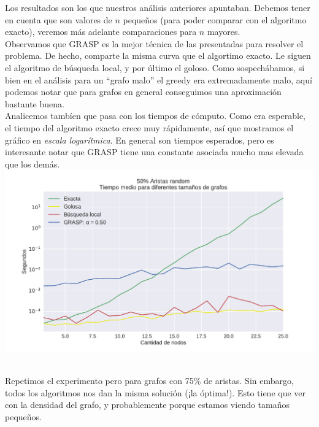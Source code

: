 Los resultados son los que nuestros análisis anteriores apuntaban. Debemos tener en cuenta que son valores de $n$ pequeños (para poder comparar con el algoritmo exacto), veremos más adelante comparaciones para $n$ mayores. \\

Observamos que GRASP es la mejor técnica de las presentadas para resolver el problema. De hecho, comparte la misma curva que el algortimo exacto. Le siguen el algoritmo de búsqueda local, y por último el goloso. Como sospechábamos, si bien en el análisis para un ``grafo malo'' el greedy era extremadamente malo, aquí podemos notar que para grafos en general conseguimos una aproximación bastante buena. \\

Analicemos tambíen que pasa con los tiempos de cómputo. Como era esperable, el tiempo del algoritmo exacto crece muy rápidamente, así que mostramos el gráfico en \textit{escala logarítmica}. En general son tiempos esperados, pero es interesante notar que GRASP tiene una constante asociada mucho mas elevada que los demás. \\

{\centering
    \includegraphics[width=1\textwidth]{informe/imgs/exp_random50_tiempo_todos_v2.pdf}
}
$ $ \newline

Repetimos el experimento pero para grafos con 75\% de aristas. Sin embargo, todos los algoritmos nos dan la misma solución (¡la óptima!). Esto tiene que ver con la densidad del grafo, y probablemente porque estamos viendo tamaños pequeños. \\

